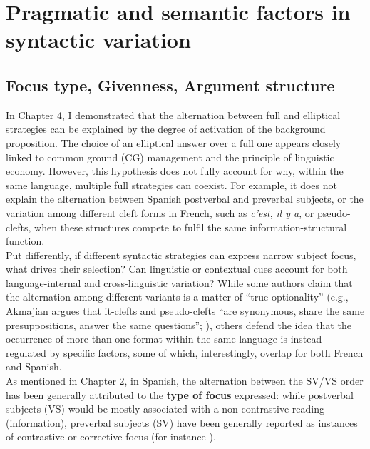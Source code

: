 \chapter{Pragmatic and semantic factors in syntactic variation}\label{sec:5}
\section{Focus type, Givenness, Argument structure}

In Chapter 4, I demonstrated that the alternation between full and elliptical strategies can be explained by the degree of activation of the background proposition. The choice of an elliptical answer over a full one appears closely linked to common ground (CG) management and the principle of linguistic economy. However, this hypothesis does not fully account for why, within the same language, multiple full strategies can coexist. For example, it does not explain the alternation between Spanish postverbal and preverbal subjects, or the variation among different cleft forms in French, such as \textit{c’est}, \textit{il y a}, or pseudo-clefts, when these structures compete to fulfil the same information-structural function. \\
Put differently, if different syntactic strategies can express narrow subject focus, what drives their selection? Can linguistic or contextual cues account for both language-internal and cross-linguistic variation?
While some authors claim that the alternation among different variants is a matter of ``true optionality” (e.g., Akmajian argues that it-clefts and pseudo-clefts “are synonymous, share the same presuppositions,  answer  the  same questions”; \cite[149]{akmajian1970deriving}), others defend the idea that the occurrence of more than one format within the same language is instead regulated by specific factors, some of which, interestingly,  overlap for both French and Spanish.\\
As mentioned in Chapter 2, in Spanish, the alternation between the SV/VS order has been generally attributed to the \textbf{type of focus} expressed: while postverbal subjects (VS) would be mostly associated with a non-contrastive reading (information), preverbal subjects (SV) have been generally reported as instances of contrastive or corrective focus (for instance \cite{zubizarreta1998prosody, costa2001postverbal, gutierrez2013structural}). \\
